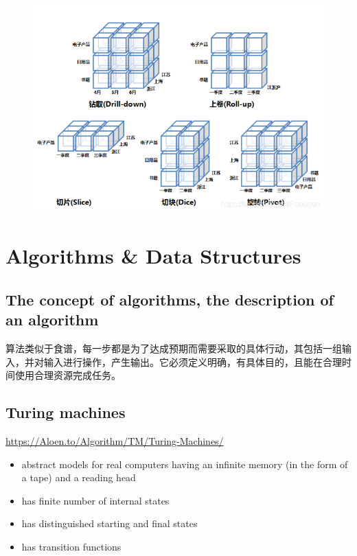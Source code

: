 \documentclass[11pt,journal,compsoc]{IEEEtran}
\begin{document}
\begin{figure}
    \centering
    \includegraphics[width=\linewidth]{Action.png}
\end{figure}


\section{Algorithms \& Data Structures}


\subsection{The concept of algorithms, the description of an algorithm}

算法类似于食谱，每一步都是为了达成预期而需要采取的具体行动，其包括一组输入，并对输入进行操作，产生输出。它必须定义明确，有具体目的，且能在合理时间使用合理资源完成任务。


\subsection{Turing machines}

\url{https://Aloen.to/Algorithm/TM/Turing-Machines/}

\begin{itemize}
    \item abstract models for real computers having an infinite memory (in the form of a tape) and a reading head

    \item has finite number of internal states

    \item has distinguished starting and final states

    \item has transition functions
\end{itemize}
\end{document}
